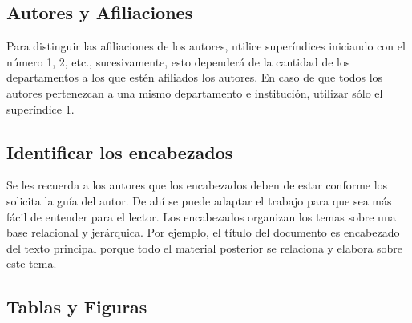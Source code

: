     
    
    
    
    \newpage
    \label{anexo:fotosDeEvidencia}
    
    
    \subsection{Autores y Afiliaciones}
    
    Para distinguir las afiliaciones de los autores, utilice superíndices iniciando con el número 1, 2, etc., sucesivamente, esto dependerá de la cantidad de los departamentos a los que estén afiliados los autores. En caso de que todos los autores pertenezcan a una mismo departamento e institución, utilizar sólo el superíndice 1. 
    
    \subsection{Identificar los encabezados}
    
    Se les recuerda a los autores que los encabezados deben de estar conforme los solicita la guía del autor. De ahí se puede adaptar el trabajo para que sea más fácil de entender para el lector.
    Los encabezados organizan los temas sobre una base relacional y jerárquica. Por ejemplo, el título del documento es encabezado del texto principal porque todo el material posterior se relaciona y elabora sobre este tema. 
    
    \subsection{Tablas y Figuras}
    
